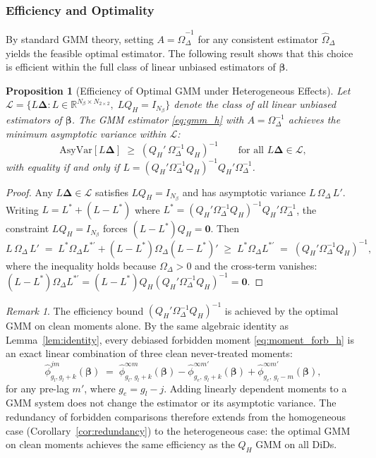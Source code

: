 \documentclass[12pt,letterpaper]{article}
\newtheorem{proposition}[theorem]{Proposition}
\theoremstyle{remark}
\newtheorem{remark}{Remark}[section]
\theoremstyle{definition}
\begin{document}
\subsubsection{Efficiency and Optimality}
\label{sec:gmm_hetero_efficiency}

By standard GMM theory, setting $A=\hat{\Omega}_\Delta^{-1}$ for any
consistent estimator $\hat{\Omega}_\Delta$ yields the feasible optimal
estimator. The following result shows that this choice is efficient within
the full class of linear unbiased estimators of $\boldsymbol{\beta}$.

\begin{proposition}[Efficiency of Optimal GMM under Heterogeneous Effects]
  \label{prop:gmm_hetero_opt}
  Let $\mathcal{L}=\{L\boldsymbol{\Delta}: L\in\mathbb{R}^{N_\beta\times
  N_{2\times2}},\; LQ_H=I_{N_\beta}\}$ denote the class of all linear
  unbiased estimators of $\boldsymbol{\beta}$. The GMM estimator
  \eqref{eq:gmm_h} with $A=\Omega_\Delta^{-1}$ achieves the minimum
  asymptotic variance within $\mathcal{L}$:
  \[
    \mathrm{AsyVar}[L\boldsymbol{\Delta}]
    \;\geq\;
    (Q_H'\,\Omega_\Delta^{-1}\,Q_H)^{-1}
    \qquad\text{for all }L\boldsymbol{\Delta}\in\mathcal{L},
  \]
  with equality if and only if
  $L=(Q_H'\Omega_\Delta^{-1}Q_H)^{-1}Q_H'\Omega_\Delta^{-1}$.
\end{proposition}

\begin{proof}
  Any $L\boldsymbol{\Delta}\in\mathcal{L}$ satisfies $LQ_H=I_{N_\beta}$
  and has asymptotic variance $L\,\Omega_\Delta\,L'$. Writing
  $L=L^*+(L-L^*)$ where
  $L^*=(Q_H'\Omega_\Delta^{-1}Q_H)^{-1}Q_H'\Omega_\Delta^{-1}$, the
  constraint $LQ_H=I_{N_\beta}$ forces $(L-L^*)Q_H=\mathbf{0}$. Then
  \[
    L\,\Omega_\Delta\,L'
    \;=\;
    L^*\Omega_\Delta L^{*\prime}
    + (L-L^*)\Omega_\Delta(L-L^*)'
    \;\geq\;
    L^*\Omega_\Delta L^{*\prime}
    \;=\;
    (Q_H'\Omega_\Delta^{-1}Q_H)^{-1},
  \]
  where the inequality holds because $\Omega_\Delta>0$ and the cross-term
  vanishes: $(L-L^*)\Omega_\Delta L^{*\prime}
  =(L-L^*)Q_H(Q_H'\Omega_\Delta^{-1}Q_H)^{-1}=\mathbf{0}$.
\end{proof}

\begin{remark}
  The efficiency bound $(Q_H'\Omega_\Delta^{-1}Q_H)^{-1}$ is achieved by
  the optimal GMM on clean moments alone. By the same algebraic identity
  as Lemma~\ref{lem:identity}, every debiased forbidden moment
  \eqref{eq:moment_forb_h} is an exact linear combination of three clean
  never-treated moments:
  \[
    \hat{\phi}^{jm}_{g_l,g_l+k}(\boldsymbol{\beta})
    \;=\;
    \hat{\phi}^{\infty m}_{g_l,\,g_l+k}(\boldsymbol{\beta})
    -\hat{\phi}^{\infty m'}_{g_e,\,g_l+k}(\boldsymbol{\beta})
    +\hat{\phi}^{\infty m'}_{g_e,\,g_l-m}(\boldsymbol{\beta}),
  \]
  for any pre-lag $m'$, where $g_e=g_l-j$. Adding linearly dependent
  moments to a GMM system does not change the estimator or its asymptotic
  variance. The redundancy of forbidden comparisons therefore extends from
  the homogeneous case (Corollary~\ref{cor:redundancy}) to the
  heterogeneous case: the optimal GMM on clean moments achieves the same
  efficiency as the $Q_H$ GMM on all DiDs.
\end{remark}
\end{document}
